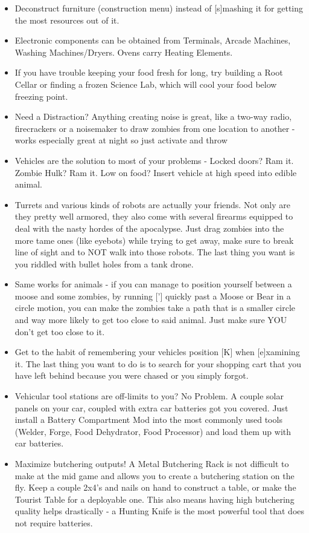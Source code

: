\begin{itemize}
\item Deconstruct furniture (construction menu) instead of [s]mashing it for getting the most resources out of it.
\item Electronic components can be obtained from Terminals, Arcade Machines, Washing Machines/Dryers. Ovens carry Heating Elements.
\item If you have trouble keeping your food fresh for long, try building a Root Cellar or finding a frozen Science Lab, which will cool your food below freezing point.
\item Need a Distraction? Anything creating noise is great, like a two-way radio, firecrackers or a noisemaker to draw zombies from one location to another - works especially great at night so just activate and throw
\item Vehicles are the solution to most of your problems - Locked doors? Ram it. Zombie Hulk? Ram it. Low on food? Insert vehicle at high speed into edible animal.
\item Turrets and various kinds of robots are actually your friends. Not only are they pretty well armored, they also come with several firearms equipped to deal with the nasty hordes of the apocalypse. Just drag zombies into the more tame ones (like eyebots) while trying to get away, make sure to break line of sight and to NOT walk into those robots. The last thing you want is you riddled with bullet holes from a tank drone.
\item Same works for animals - if you can manage to position yourself between a moose and some zombies, by running ['] quickly past a Moose or Bear in a circle motion, you can make the zombies take a path that is a smaller circle and way more likely to get too close to said animal. Just make sure YOU don't get too close to it.
\item Get to the habit of remembering your vehicles position [K] when [e]xamining it. The last thing you want to do is to search for your shopping cart that you have left behind because you were chased or you simply forgot.
\item Vehicular tool stations are off-limits to you? No Problem. A couple solar panels on your car, coupled with extra car batteries got you covered. Just install a Battery Compartment Mod into the most commonly used tools (Welder, Forge, Food Dehydrator, Food Processor) and load them up with car batteries.
\item Maximize butchering outputs! A Metal Butchering Rack is not difficult to make at the mid game and allows you to create a butchering station on the fly. Keep a couple 2x4's and nails on hand to construct a table, or make the Tourist Table for a deployable one. This also means having high butchering quality helps drastically - a Hunting Knife is the most powerful tool that does not require batteries.

\end{itemize}
